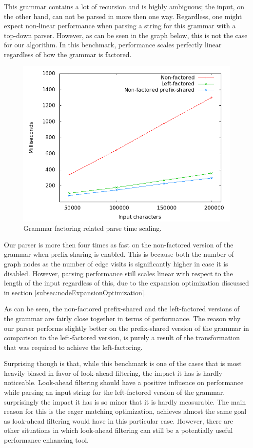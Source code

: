 \documentclass[a4paper,10pt]{article}
\begin{document}
This grammar contains a lot of recursion and is highly ambiguous; the input, on the other hand, can not be parsed in more then one way. Regardless, one might expect non-linear performance when parsing a string for this grammar with a top-down parser. However, as can be seen in the graph below, this is not the case for our algorithm. In this benchmark, performance scales perfectly linear regardless of how the grammar is factored.

\begin{figure}[H]
\centering
\includegraphics[scale=0.4]{grammar-factoring.png}
\caption{Grammar factoring related parse time scaling.}
\end{figure}

Our parser is more then four times as fast on the non-factored version of the grammar when prefix sharing is enabled. This is because both the number of graph nodes as the number of edge visits is significantly higher in case it is disabled. However, parsing performance still scales linear with respect to the length of the input regardless of this, due to the expansion optimization discussed in section \ref{subsec:nodeExpansionOptimization}.

As can be seen, the non-factored prefix-shared and the left-factored versions of the grammar are fairly close together in terms of performance. The reason why our parser performs slightly better on the prefix-shared version of the grammar in comparison to the left-factored version, is purely a result of the transformation that was required to achieve the left-factoring.

Surprising though is that, while this benchmark is one of the cases that is most heavily biased in favor of look-ahead filtering, the impact it has is hardly noticeable. Look-ahead filtering should have a positive influence on performance while parsing an input string for the left-factored version of the grammar, surprisingly the impact it has is so minor that it is hardly measurable. The main reason for this is the eager matching optimization, achieves almost the same goal as look-ahead filtering would have in this particular case. However, there are other situations in which look-ahead filtering can still be a potentially useful performance enhancing tool.
\end{document}

